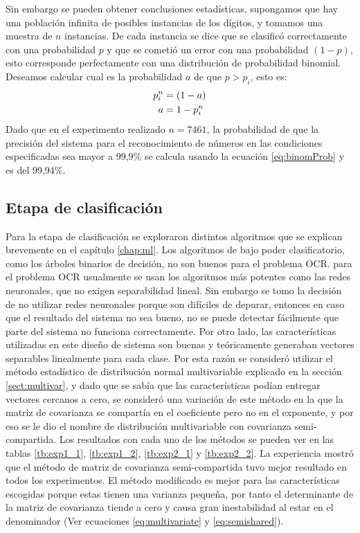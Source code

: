 \documentclass[a4paper, 11pt, oneside]{report}
\begin{document}
Sin embargo se pueden obtener conclusiones estadísticas, supongamos que hay una población infinita de posibles instancias de los dígitos, y tomamos una muestra de $n$ instancias. De cada instancia se dice que se clasificó correctamente con una probabilidad $p$ y que se cometió un error con una probabilidad $(1-p)$, esto corresponde perfectamente con una distribución de probabilidad binomial. Deseamos calcular cual es la probabilidad $a$ de que $p>p_i$, esto es:
\begin{align}
p_i^n &= (1-a) \notag \\
a &= 1-p_i^n \label{eq:binomProb}
\end{align}
Dado que en el experimento realizado $n=7461$, la probabilidad de que la precisión del sistema para el reconocimiento de números en las condiciones especificadas sea mayor a 99,9\% se calcula usando la ecuación \ref{eq:binomProb} y es del 99,94\%.
\subsection{Etapa de clasificación}
Para la etapa de clasificación se exploraron distintos algoritmos que se explican brevemente en el capítulo \ref{chap:ml}. Los algoritmos de bajo poder clasificatorio, como los árboles binarios de decisión, no son buenos para el problema OCR. para el problema OCR usualmente se usan los algoritmos más potentes como las redes neuronales, que no exigen separabilidad lineal. Sin embargo se tomo la decisión de no utilizar redes neuronales porque son difíciles de depurar, entonces en caso que el resultado del sistema no sea bueno, no se puede detectar fácilmente que parte del sistema no funciona correctamente. Por otro lado, las características utilizadas en este diseño de sistema son buenas y teóricamente generaban vectores separables linealmente para cada clase.
Por esta razón se consideró utilizar el método estadístico de distribución normal multivariable explicado en la sección \ref{sect:multivar}, y dado que se sabía que las características podían entregar vectores cercanos a cero, se consideró una variación de este método en la que la matriz de covarianza se compartía en el coeficiente pero no en el exponente, y por eso se le dio el nombre de distribución multivariable con covarianza semi-compartida. Los resultados con cada uno de los métodos se pueden ver en las tablas \ref{tb:exp1_1}, \ref{tb:exp1_2}, \ref{tb:exp2_1} y \ref{tb:exp2_2}.
La experiencia mostró que el método de matriz de covarianza semi-compartida tuvo mejor resultado en todos los experimentos. El método modificado es mejor para las características escogidas porque estas tienen una varianza pequeña, por tanto el determinante de la matriz de covarianza tiende a cero y causa gran inestabilidad al estar en el denominador (Ver ecuaciones \ref{eq:multivariate} y \ref{eq:semishared}).
\end{document}
